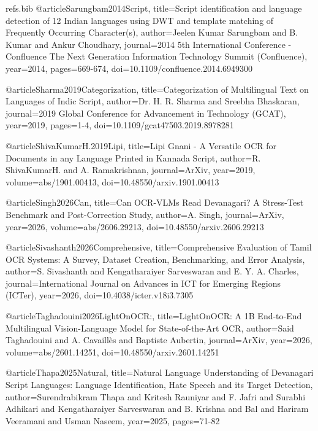 \begin{filecontents}{refs.bib}
    @article{Sarungbam2014Script,
    title={Script identification and language detection of 12 Indian languages using DWT and template matching of Frequently Occurring Character(s)},
    author={Jeelen Kumar Sarungbam and B. Kumar and Ankur Choudhary},
    journal={2014 5th International Conference - Confluence The Next Generation Information Technology Summit (Confluence)},
    year={2014},
    pages={669-674},
    doi={10.1109/confluence.2014.6949300}
    }
    
    @article{Sharma2019Categorization,
    title={Categorization of Multilingual Text on Languages of Indic Script},
    author={Dr. H. R. Sharma and Sreebha Bhaskaran},
    journal={2019 Global Conference for Advancement in Technology (GCAT)},
    year={2019},
    pages={1-4},
    doi={10.1109/gcat47503.2019.8978281}
    }
    
    @article{ShivaKumarH.2019Lipi,
    title={Lipi Gnani - A Versatile OCR for Documents in any Language Printed in Kannada Script},
    author={R. ShivaKumarH. and A. Ramakrishnan},
    journal={ArXiv},
    year={2019},
    volume={abs/1901.00413},
    doi={10.48550/arxiv.1901.00413}
    }
    
    @article{Singh2026Can,
    title={Can OCR-VLMs Read Devanagari? A Stress-Test Benchmark and Post-Correction Study},
    author={A. Singh},
    journal={ArXiv},
    year={2026},
    volume={abs/2606.29213},
    doi={10.48550/arxiv.2606.29213}
    }
    
    @article{Sivashanth2026Comprehensive,
    title={Comprehensive Evaluation of Tamil OCR Systems: A Survey, Dataset Creation, Benchmarking, and Error Analysis},
    author={S. Sivashanth and Kengatharaiyer Sarveswaran and E. Y. A. Charles},
    journal={International Journal on Advances in ICT for Emerging Regions (ICTer)},
    year={2026},
    doi={10.4038/icter.v18i3.7305}
    }
    
    @article{Taghadouini2026LightOnOCR:,
    title={LightOnOCR: A 1B End-to-End Multilingual Vision-Language Model for State-of-the-Art OCR},
    author={Said Taghadouini and A. Cavaillès and Baptiste Aubertin},
    journal={ArXiv},
    year={2026},
    volume={abs/2601.14251},
    doi={10.48550/arxiv.2601.14251}
    }
    
    @article{Thapa2025Natural,
    title={Natural Language Understanding of Devanagari Script Languages: Language Identification, Hate Speech and its Target Detection},
    author={Surendrabikram Thapa and Kritesh Rauniyar and F. Jafri and Surabhi Adhikari and Kengatharaiyer Sarveswaran and B. Krishna and Bal and Hariram Veeramani and Usman Naseem},
    year={2025},
    pages={71-82}
    }
    

\end{filecontents}
